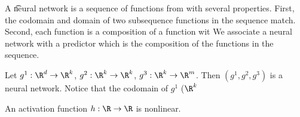 


A \t{neural network} is a sequence of functions from  with several properties.
First, the codomain and domain of two subsequence functions in the sequence match.
Second, each function is a composition of a function wit
We associate a neural network with a predictor which is the composition of the functions in the sequence.


Let $g^1: \R^d \to \R^k$, $g^2: \R^k \to \R^k$, $g^3: \R^k \to \R^m$.
Then $(g^1, g^2, g^3)$ is a neural network.
Notice that the codomain of $g^1$ ($\R^k$


An activation function $h: \R \to \R$ is nonlinear.

\blankpage
